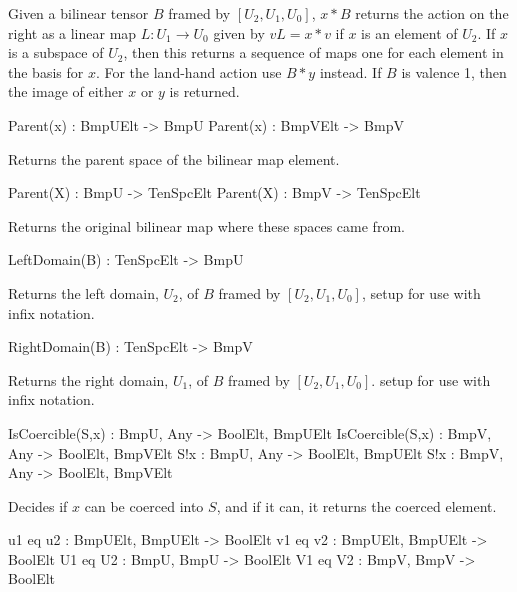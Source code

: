 Given a bilinear tensor $B$ framed by $[U_2,U_1,U_0]$,
$x*B$ returns the action on the right as a 
linear map $L : U_1\rightarrow U_0$ given 
by $vL = x* v$ if $x$ is an element of $U_2$. 
If $x$ is a subspace of $U_2$, then this returns a sequence of 
maps one for each element in the basis for $x$.
For the land-hand action use $B*y$ instead.
If $B$ is valence 1, then the image of either $x$ or $y$ is returned.

\begin{intrinsics}
Parent(x) : BmpUElt -> BmpU
Parent(x) : BmpVElt -> BmpV
\end{intrinsics}

Returns the parent space of the bilinear map element.

\begin{intrinsics}
Parent(X) : BmpU -> TenSpcElt
Parent(X) : BmpV -> TenSpcElt
\end{intrinsics}

Returns the original bilinear map where these spaces came from.

\begin{intrinsics}
LeftDomain(B) : TenSpcElt -> BmpU
\end{intrinsics}

Returns the left domain, $U_2$, of $B$ framed by $[U_2,U_1,U_0]$, 
setup for use with infix notation.

\begin{intrinsics}
RightDomain(B) : TenSpcElt -> BmpV
\end{intrinsics}

Returns the right domain, $U_1$, of $B$  framed by $[U_2,U_1,U_0]$. 
setup for use with infix notation.

\begin{intrinsics}
IsCoercible(S,x) : BmpU, Any -> BoolElt, BmpUElt
IsCoercible(S,x) : BmpV, Any -> BoolElt, BmpVElt
S!x : BmpU, Any -> BoolElt, BmpUElt
S!x : BmpV, Any -> BoolElt, BmpVElt
\end{intrinsics}

Decides if $x$ can be coerced into $S$, and if it can, it returns the coerced 
element.

\begin{intrinsics}
u1 eq u2 : BmpUElt, BmpUElt -> BoolElt
v1 eq v2 : BmpUElt, BmpUElt -> BoolElt
U1 eq U2 : BmpU, BmpU -> BoolElt
V1 eq V2 : BmpV, BmpV -> BoolElt
\end{intrinsics}

